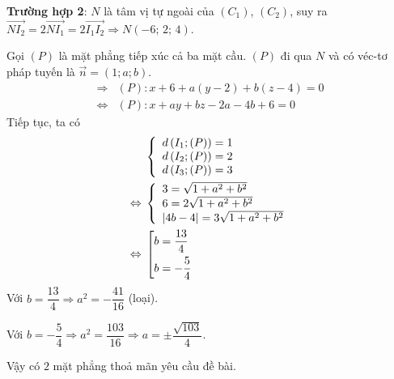 \begin{ex}
{{			\noindent \textbf{Trường hợp 2}: $N$ là tâm vị tự ngoài của $(C_1)$, $(C_2)$, suy ra $\overrightarrow {N{I_2}}  = 2\overrightarrow {N{I_1}}  = 2\overrightarrow {{I_1}{I_2}}  \Rightarrow N\left( { - 6;\,2;\,4} \right)$.
		}{}
		\noindent Gọi $(P)$ là mặt phẳng tiếp xúc cả ba mặt cầu. $(P)$ đi qua $N$ và có véc-tơ pháp tuyến là $\overrightarrow n = (1;a;b)$.
		\begin{align*}
			\Rightarrow{} &\left( P \right) \colon x + 6 + a\left( {y - 2} \right) + b\left( {z - 4} \right) = 0 \\
			\Leftrightarrow{} &\left( P \right) \colon x + ay + bz - 2a - 4b + 6 = 0
		\end{align*}
		\noindent Tiếp tục, ta có
		\begin{align*}
			&\left\{ {\begin{array}{l}
					{d\left( {{I_1};(P)} \right) = 1} \\ 
					{d\left( {{I_2};(P)} \right) = 2} \\ 
					{d\left( {{I_3};(P)} \right) = 3} 
			\end{array}} \right. \\
			\Leftrightarrow{} &\left\{ \begin{array}{l}
				3 = \sqrt {1 + {a^2} + {b^2}} \\
				6 = 2\sqrt {1 + {a^2} + {b^2}} \\
				\left| {4b - 4} \right| = 3\sqrt {1 + {a^2} + {b^2}}  \hfill \\ 
			\end{array}  \right. \\
			\Leftrightarrow{} &\left[ \begin{gathered}
				b = \frac{{13}}{4} \hfill \\
				b =  - \frac{5}{4} \hfill \\ 
			\end{gathered}  \right.
		\end{align*}
		\noindent Với $b = \dfrac{13}{4} \Rightarrow a^2 = -\dfrac{41}{16}$ (loại).
		
		\noindent Với $b = -\dfrac{5}{4} \Rightarrow {a^2} = \dfrac{{103}}{{16}} \Rightarrow a =  \pm \dfrac{{\sqrt {103} }}{4}$.
		
		\noindent Vậy có $2$ mặt phẳng thoả mãn yêu cầu đề bài.
	}
\end{ex}
